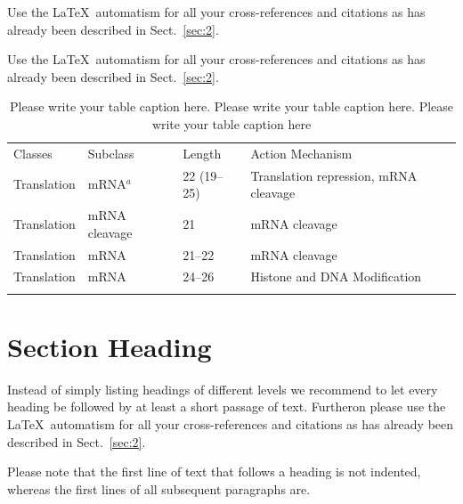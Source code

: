  Use the \LaTeX\ automatism for all your cross-references and citations as has already been described in Sect.~\ref{sec:2}.

 Use the \LaTeX\ automatism for all your cross-refer\-ences and citations as has already been described in Sect.~\ref{sec:2}.
%
%


	
		

\begin{table}

\caption{Please write your table caption here. Please write your table caption here. Please write your table caption here}
\label{tab:1}       %
%
%
\begin{tabular}{p{3cm}p{3.4cm}p{3cm}p{4.9cm}}
\hline\noalign{\smallskip}
Classes & Subclass & Length & Action Mechanism  \\
\noalign{\smallskip}\svhline\noalign{\smallskip}
Translation & mRNA$^a$  & 22 (19--25) & Translation repression, mRNA cleavage\\
Translation & mRNA cleavage & 21 & mRNA cleavage\\
Translation & mRNA  & 21--22 & mRNA cleavage\\
Translation & mRNA  & 24--26 & Histone and DNA Modification\\
\noalign{\smallskip}\hline\noalign{\smallskip}
\end{tabular}
\end{table}
	



%
\section{Section Heading}
\label{sec:3}
Instead of simply listing headings of different levels we recommend to let every heading be followed by at least a short passage of text. Furtheron please use the \LaTeX\ automatism for all your cross-references and citations as has already been described in Sect.~\ref{sec:2}.

Please note that the first line of text that follows a heading is not indented, whereas the first lines of all subsequent paragraphs are.

